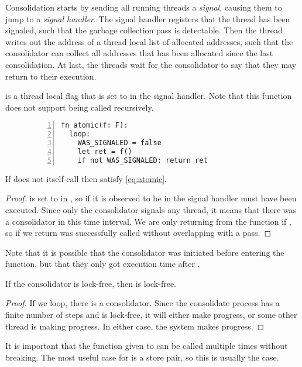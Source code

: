 Consolidation starts by sending all running threads a \emph{signal}, causing them to jump to a
\emph{signal handler}. The signal handler registers that the thread has been signaled, such that the
garbage collection pass is detectable. Then the thread writes out the address of a thread local
list of allocated addresses, such that the consolidator can collect all addresses that has been
allocated since the last consolidation. At last, the threads wait for the consolidator to say that
they may return to their execution. 


   is a thread local flag that is
  set to  in the signal handler. Note that this function does not support being called
  recursively.
\begin{figure}[ht]
  \begin{lstlisting}[numbers=left,numberstyle=\color{gray}\ttfamily{}A,caption=Pseudocode of $atomic$]
fn atomic(f: F):
  loop:
    WAS_SIGNALED = false
    let ret = f()
    if not WAS_SIGNALED: return ret
\end{lstlisting}
\end{figure}

\begin{theorem}
  If  does not itself call  then  satisfy
  \cref{eq:atomic}.
\end{theorem}
\begin{proof}
   is set to  in , so if it is observed to be
   in  the signal handler must have been executed. Since only the consolidator
  signals any thread, it means that there was a consolidator in this time interval. We are only
  returning from the function if , so if we return  was
  successfully called without overlapping with a pass.
\end{proof}
Note that it is possible that the consolidator was initiated before entering the 
function, but that they only got execution time after .
\begin{lemma}
  If the consolidator is lock-free, then  is lock-free.
\end{lemma}
\begin{proof}
  If we loop, there is a consolidator. Since the consolidate process has a finite number of steps
  and is lock-free, it will either make progress, or some other thread is making progress. In
  either case, the system makes progress.
\end{proof}

It is important that the function given to  can be called multiple times without
breaking. The most useful case for  is a  store pair, so this is
usually the case.
